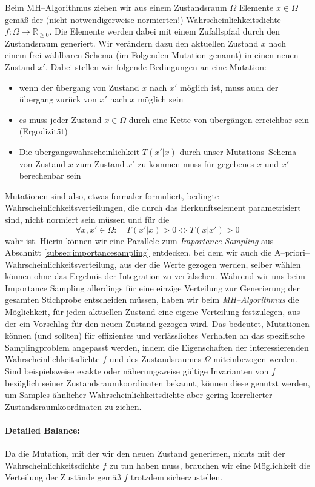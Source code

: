 	Beim MH--Algorithmus ziehen wir aus einem Zustandsraum $\Omega$ Elemente $x \in \Omega$ gemäß der (nicht notwendigerweise normierten!) Wahrscheinlichkeitsdichte $f : \Omega \rightarrow \mathbb{R}_{\geq 0}$. Die Elemente werden dabei mit einem Zufallspfad durch den Zustandsraum generiert. Wir verändern dazu den aktuellen Zustand $x$ nach einem frei wählbaren Schema (im Folgenden Mutation genannt) in einen neuen Zustand $x'$.
	Dabei stellen wir folgende Bedingungen an eine Mutation:
	\begin{itemize}
		\item{wenn der übergang von Zustand $x$ nach $x'$ möglich ist, muss auch der übergang zurück von $x'$ nach $x$ möglich sein}
		\item{es muss jeder Zustand $x \in \Omega$ durch eine Kette von übergängen erreichbar sein (Ergodizität)}
		\item{Die übergangswahrscheinlichkeit $T(x'|x)$ durch unser Mutations--Schema von Zustand $x$ zum Zustand $x'$ zu kommen muss für gegebenes $x$ und $x'$ berechenbar sein}
	\end{itemize}
	Mutationen sind also, etwas formaler formuliert, bedingte Wahrscheinlichkeitsverteilungen, die durch das Herkunftselement parametrisiert sind, nicht normiert sein müssen und für die
	$$\forall x,x'\in\Omega : \quad T(x'|x)>0 \Leftrightarrow T(x|x')>0$$
	wahr ist. Hierin können wir eine Parallele zum {\em Importance Sampling} aus Abschnitt \ref{subsec:importancesampling} entdecken, bei dem wir auch die A--priori--Wahr\-schein\-lich\-keits\-ver\-tei\-lung, aus der die Werte gezogen werden, selber wählen können ohne das Ergebnis der Integration zu verfälschen. Während wir uns beim Importance Sampling allerdings für eine einzige Verteilung zur Generierung der gesamten Stichprobe entscheiden müssen, haben wir beim {\em MH--Algorithmus} die Möglichkeit, für jeden aktuellen Zustand eine eigene Verteilung festzulegen, aus der ein Vorschlag für den neuen Zustand gezogen wird.
	Das bedeutet, Mutationen können (und sollten) für effizientes und verlässliches Verhalten an das spezifische Samplingproblem angepasst werden, indem die Eigenschaften der interessierenden Wahrscheinlichkeitsdichte $f$ und des Zustandsraumes $\Omega$ miteinbezogen werden. Sind beispielsweise exakte oder näherungsweise gültige Invarianten von $f$ bezüglich seiner Zustandsraumkoordinaten bekannt, können diese genutzt werden, um Samples ähnlicher Wahrscheinlichkeitsdichte aber gering korrelierter Zustandsraumkoordinaten zu ziehen.
	
		
	\paragraph{Detailed Balance:}
	Da die Mutation, mit der wir den neuen Zustand generieren, nichts mit der Wahrscheinlichkeitsdichte $f$ zu tun haben muss, brauchen wir eine Möglichkeit die Verteilung der Zustände gemäß $f$ trotzdem sicherzustellen.
	
